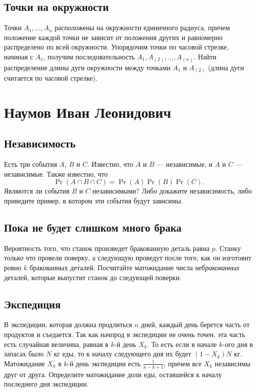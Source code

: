 \documentclass[12pt]{article}
\begin{document}
\subsection{Точки на окружности}
Точки $A_1, \dots, A_n$ расположены на окружности единичного радиуса, причем положение каждой точки не зависит от положения других и равномерно распределено по всей окружности. Упорядочим точки по часовой стрелке, начиная с $A_1$, получим последовательность $A_1, A_{(2)}, \dots, A_{(n)}$. Найти распределение длины дуги окружности между точками $A_1$ и $A_{(2)}$ (длина дуги считается по часовой стрелке).

\newpage
\section{Наумов Иван Леонидович}

\subsection{Независимость}
Есть три события $A$, $B$ и $C$. Известно, что $A$ и $B$ --- независимые, и $A$ и $C$ --- независимые. Также известно, что \[\Pr(A \cap B \cap C) = \Pr(A)\Pr(B)\Pr(C).\] Являются ли события $B$ и $C$ независимыми? Либо докажите независимость, либо приведите пример, в котором эти события будут зависимы.

\subsection{Пока не будет слишком много брака}
Вероятность того, что станок произведет бракованную деталь равна $p$. Станку только что провели поверку, а следующую проведут после того, как он изготовит ровно $k$ бракованных деталей. Посчитайте матожидание числа \emph{небракованных} деталей, которые выпустит станок до следующей поверки.

\subsection{Экспедиция}
В экспедиции, которая должна продлиться $n$ дней, каждый день берется часть от продуктов и съедается. Так как начпрод в экспедиции не очень точен, эта часть есть случайная величина, равная в $k$-й день $X_k$. То есть если в начале $k$-ого дня в запасах было $N$ кг еды, то к началу следующего дня их будет $(1 - X_k)N$ кг. Матожидание $X_k$ в $k$-й день экспедиции есть $\frac{1}{n - k + 1}$, причем все $X_k$ независимы друг от друга. Определите матожидание доли еды, оставшейся к началу последнего дня экспедиции.
\end{document}
